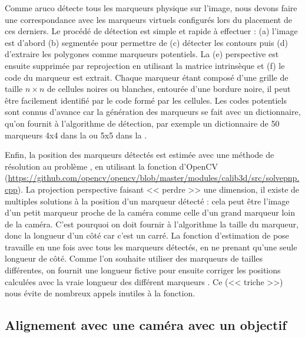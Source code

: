 Comme aruco détecte tous les marqueurs physique sur l'image, nous devons faire une correspondance avec les marqueurs virtuels configurés lors du placement de ces derniers. Le procédé de détection est simple et rapide à effectuer  : (a) l'image est d'abord (b) segmentée pour permettre de (c) détecter les contours puis (d) d'extraire les polygones comme marqueurs potentiels. La (e) perspective est ensuite supprimée par reprojection en utilisant la matrice intrinsèque et (f) le code du marqueur est extrait. Chaque marqueur étant composé d'une grille de taille $n \times n$ de cellules noires ou blanches, entourée d'une bordure noire, il peut être facilement identifié par le code formé par les cellules. Les codes potentiels sont connus d'avance car la génération des marqueurs se fait avec un dictionnaire, qu'on fournit à l'algorithme de détection, par exemple un dictionnaire de 50 marqueurs 4x4 dans la  ou 5x5 dans la .

Enfin, la position des marqueurs détectés est estimée avec une méthode de résolution au problème , en utilisant la fonction  d'OpenCV (\url{https://github.com/opencv/opencv/blob/master/modules/calib3d/src/solvepnp.cpp}). La projection perspective faisant << perdre >> une dimension, il existe de multiples solutions à la position d'un marqueur détecté : cela peut être l'image d'un petit marqueur proche de la caméra comme celle d'un grand marqueur loin de la caméra. C'est pourquoi on doit fournir à l'algorithme la taille du marqueur, donc la longueur d'un côté car c'est un carré. La fonction d'estimation de pose travaille en une fois avec tous les marqueurs détectés, en ne prenant qu'une seule longueur de côté. Comme l'on souhaite utiliser des marqueurs de tailles différentes, on fournit une longueur fictive pour ensuite corriger les positions calculées avec la vraie longueur des différent marqueurs . Ce  (<< triche >>) nous évite de nombreux appels inutiles à la fonction.


\subsection{Alignement avec une caméra avec un objectif }
\label{subsec:fisheye_camera_calibration}

